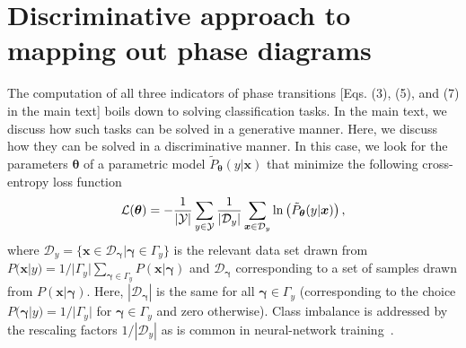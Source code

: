 \documentclass[twocolumn,aps,pra,superscriptaddress,tightlines,nofootinbib]{revtex4-2}
\begin{document}
	\section{Discriminative approach to mapping out phase diagrams}\label{sec:discr_indicators}
	The computation of all three indicators of phase transitions [Eqs. (3), (5), and (7) in the main text] boils down to solving classification tasks. In the main text, we discuss how such tasks can be solved in a generative manner. Here, we discuss how they can be solved in a discriminative manner. In this case, we look for the parameters $\bm{\theta}$ of a parametric model $\tilde{P}_{\bm{\theta}}(y|\bm{x})$ that minimize the following cross-entropy loss function
	\begin{equation}\label{eq:SI_x1}
		\mathcal{L}(\bm{\theta}) = - \frac{1}{|\mathcal{Y}|} \sum_{y \in \mathcal{Y}} \frac{1}{|\mathcal{D}_{y}|} \sum_{\bm{x} \in \mathcal{D}_{y}}  {\rm ln}\left(\tilde{P}_{\bm{\theta}}(y|\bm{x})\right),
	\end{equation}
	where $\mathcal{D}_{y} = \{ \bm{x} \in \mathcal{D}_{\bm{\gamma}} |\bm{\gamma} \in \Gamma_{y}\}$ is the relevant data set drawn from $P(\bm{x}|y)=1/|\Gamma_{y}| \sum_{\bm{\gamma} \in \Gamma_{y}} P(\bm{x}|\bm{\gamma})$ and $\mathcal{D}_{\bm{\gamma}}$ corresponding to a set of samples drawn from $P(\bm{x}|\bm{\gamma})$. Here, $|\mathcal{D}_{\bm{\gamma}}|$ is the same for all $\bm{\gamma} \in \Gamma_{y}$ (corresponding to the choice $P(\bm{\gamma}|y) = 1 / |\Gamma_{y}|$ for $\bm{\gamma}\in \Gamma_{y}$ and zero otherwise). Class imbalance is addressed by the rescaling factors $1/|\mathcal{D}_{y}|$ as is common in neural-network training~\cite{paszke:2019}. 
	
\end{document}

